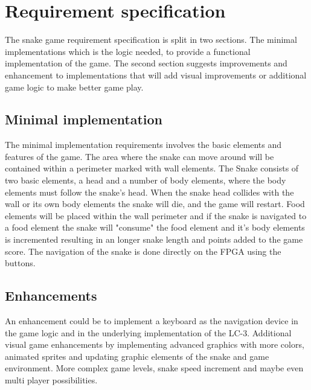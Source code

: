 \documentclass{acm_proc_article-sp}
\begin{document}
\section{Requirement specification}
The snake game requirement specification is split in two sections. The minimal implementations which is the logic needed, to provide a functional implementation of the game.
The second section suggests improvements and enhancement to implementations that will add visual improvements or additional game logic to make better game play. 

\subsection{Minimal implementation}
The minimal implementation requirements involves the basic elements and features of the game. The area where the snake can move around will be contained within a perimeter marked with wall elements. The Snake consists of two basic elements, a head and a number of body elements, where the body elements must follow the snake's head. When the snake head collides with the wall or its own body elements the snake will die, and the game will restart. Food elements will be placed within the wall perimeter and if the snake is navigated to a food element the snake will "consume" the food element and it's body elements is incremented resulting in an longer snake length and points added to the game score. The navigation of the snake is done directly on the FPGA using the buttons.


\subsection{Enhancements}
An enhancement could be to implement a keyboard as the navigation device in the game logic and in the underlying implementation of the LC-3. 
Additional visual game enhancements by implementing advanced graphics with more colors, animated sprites and updating graphic elements of the snake and game environment. 
More complex game levels, snake speed increment and maybe even multi player possibilities. 
\end{document}
